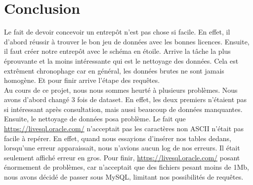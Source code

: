 \documentclass[11pt, a4paper]{article}
\newcommand\tab{\hspace*{12.5mm}}
\begin{document}
\section{Conclusion}
\tab Le fait de devoir concevoir un entrepôt n'est pas chose si facile. En effet, il d'abord réussir à trouver le bon jeu de données avec les bonnes licences. Ensuite, il faut créer notre entrepôt avec le schéma en étoile. Arrive la tâche la plus éprouvante et la moins intéressante qui est le nettoyage des données. Cela est extrêment chronophage car en général, les données brutes ne sont jamais homogène. Et pour finir arrive l'étape des requêtes.\\
\tab Au cours de ce projet, nous nous sommes heurté à plusieurs problèmes. Nous avons d'abord changé 3 fois de dataset. En effet, les deux premiers n'étaient pas si intéressant après consultation, mais aussi beaucoup de données manquantes. Ensuite, le nettoyage de données posa problème. Le fait que \url{https://livesql.oracle.com/} n'acceptait pas les caractères non ASCII n'était pas facile à repérer. En effet, quand nous essayions d'insérer nos tables dedans, lorsqu'une erreur apparaissait, nous n'avions aucun log de nos erreurs. Il était seulement affiché erreur en gros. Pour finir, \url{https://livesql.oracle.com/} posant énormement de problèmes, car n'acceptait que des fichiers pesant moins de 1Mb, nous avons décidé de passer sous MySQL, limitant nos possibilités de requêtes.
\end{document}
